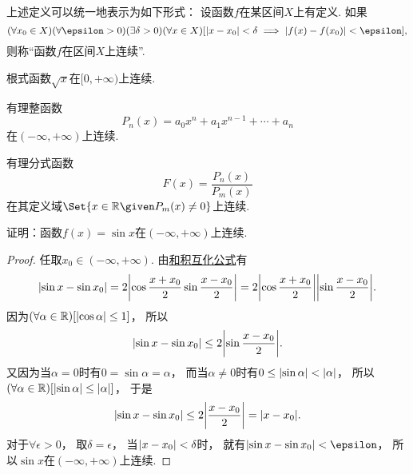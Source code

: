 \begin{remark}
上述定义可以统一地表示为如下形式：
设函数\(f\)在某区间\(X\)上有定义.
如果\begin{equation*}
	(\forall x_0\in X)
	(\forall\epsilon>0)
	(\exists\delta>0)
	(\forall x\in X)
	[
		\abs{x-x_0}<\delta
		\implies
		\abs{f(x)-f(x_0)}<\epsilon
	],
\end{equation*}
则称“函数\(f\)在区间\(X\)上连续”.
\end{remark}

\begin{example}
根式函数\(\sqrt{x}\)在\([0,+\infty)\)上连续.
\end{example}

\begin{example}
有理整函数\begin{equation*}
	P_n(x) = a_0 x^n + a_1 x^{n-1} + \dotsb + a_n
\end{equation*}在\((-\infty,+\infty)\)上连续.
\end{example}

\begin{example}
有理分式函数\begin{equation*}
	F(x) = \frac{P_n(x)}{P_m(x)}
\end{equation*}在其定义域\(\Set{ x\in\mathbb{R} \given P_m(x)\neq0 }\)上连续.
\end{example}

\begin{example}\label{example:极限.正弦函数在实数域上连续}
证明：函数\(f(x) = \sin x\)在\((-\infty,+\infty)\)上连续.
\begin{proof}
任取\(x_0\in(-\infty,+\infty)\).
由\hyperref[equation:函数.三角函数.和积互化公式12]{和积互化公式}有\begin{equation*}
	\abs{\sin x - \sin x_0}
	= 2 \abs{\cos\frac{x+x_0}2 \sin\frac{x-x_0}2}
	= 2 \abs{\cos\frac{x+x_0}2} \abs{\sin\frac{x-x_0}2}.
\end{equation*}
因为\((\forall\alpha\in\mathbb{R})[\abs{\cos\alpha}\leq1]\)，
所以\begin{equation*}
	\abs{\sin x - \sin x_0} \leq 2 \abs{\sin\frac{x-x_0}2}.
\end{equation*}
又因为当\(\alpha=0\)时有\(0=\sin\alpha=\alpha\)，
而当\(\alpha\neq0\)时有\(0\leq\abs{\sin\alpha}<\abs{\alpha}\)，
所以\((\forall\alpha\in\mathbb{R})[\abs{\sin\alpha}\leq\abs{\alpha}]\)，
于是\begin{equation*}
	\abs{\sin x - \sin x_0}
	\leq 2 \abs{\frac{x-x_0}2}
	= \abs{x-x_0}.
\end{equation*}
对于\(\forall\epsilon>0\)，
取\(\delta=\epsilon\)，
当\(\abs{x-x_0}<\delta\)时，
就有\(\abs{\sin x-\sin x_0}<\epsilon\)，
所以\(\sin x\)在\((-\infty,+\infty)\)上连续.
\end{proof}
\end{example}

